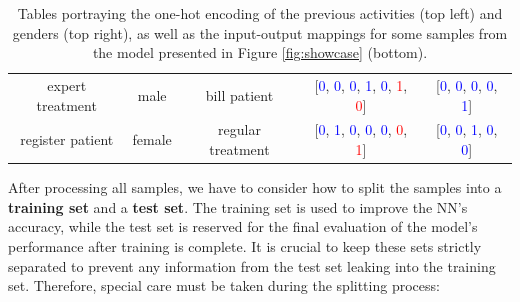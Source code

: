 \begin{table}[h!]
\begin{minipage}{0.7\textwidth}
\begin{tabular}{c | c | c | c | c}
            expert treatment & male & bill patient & 
            [\textcolor{blue}{0}, \textcolor{blue}{0}, \textcolor{blue}{0}, \textcolor{blue}{1}, \textcolor{blue}{0}, \textcolor{red}{1}, \textcolor{red}{0}] & 
            [\textcolor{blue}{0}, \textcolor{blue}{0}, \textcolor{blue}{0}, \textcolor{blue}{0}, \textcolor{blue}{1}] \\
            
            register patient & female & regular treatment & 
            [\textcolor{blue}{0}, \textcolor{blue}{1}, \textcolor{blue}{0}, \textcolor{blue}{0}, \textcolor{blue}{0}, \textcolor{red}{0}, \textcolor{red}{1}] & 
            [\textcolor{blue}{0}, \textcolor{blue}{0}, \textcolor{blue}{1}, \textcolor{blue}{0}, \textcolor{blue}{0}] \\
            \bottomrule
        \end{tabular}
    \end{minipage}

    \vspace{0.2cm}

    \caption{Tables portraying the one-hot encoding of the previous activities (top left) and genders (top right),
    as well as the input-output mappings for some samples from the model presented in Figure \ref{fig:showcase} (bottom).
    }
    \label{tab:preprocessing}
\end{table}


After processing all samples, we have to consider how to split the samples into a \textbf{training set} and a \textbf{test set}.
The training set is used to improve the NN's accuracy,
while the test set is reserved for the final evaluation of the model's performance after training is complete.
It is crucial to keep these sets strictly separated to prevent any information
from the test set leaking into the training set.
Therefore, special care must be taken during the splitting process: \cite{data_split}

